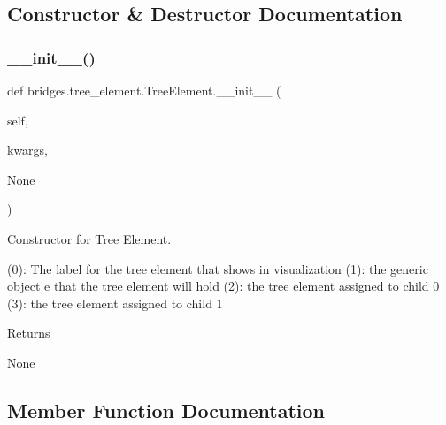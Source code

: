 \subsection{Constructor \& Destructor Documentation}
\mbox{\label{classbridges_1_1tree__element_1_1_tree_element_a37f9f119e4a1c0ff01b30bbb2f505a97}} 
\subsubsection{\texorpdfstring{\+\_\+\+\_\+init\+\_\+\+\_\+()}{\_\_init\_\_()}}
{\footnotesize\ttfamily def bridges.\+tree\+\_\+element.\+Tree\+Element.\+\_\+\+\_\+init\+\_\+\+\_\+ (\begin{DoxyParamCaption}\item[{}]{self,  }\item[{}]{kwargs,  }\item[{}]{None }\end{DoxyParamCaption})}



Constructor for Tree Element. 

(0)\+: The label for the tree element that shows in visualization (1)\+: the generic object \textquotesingle{}e\textquotesingle{} that the tree element will hold (2)\+: the tree element assigned to child 0 (3)\+: the tree element assigned to child 1 \begin{DoxyReturn}{Returns}


None 
\end{DoxyReturn}


\subsection{Member Function Documentation}
\mbox{\label{classbridges_1_1tree__element_1_1_tree_element_a7a5933a3de19a896712389dda41a4452}} 
